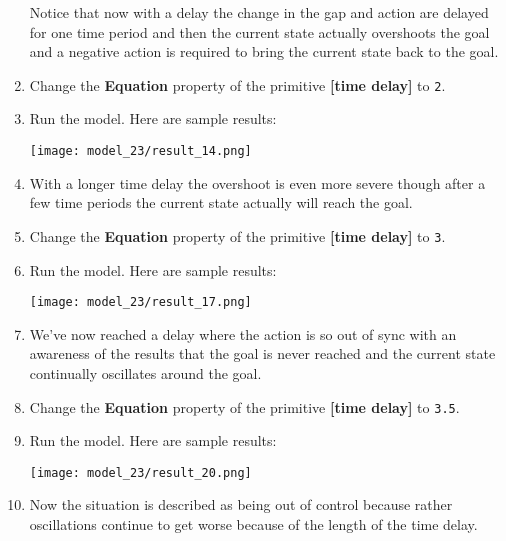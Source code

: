 \documentclass[]{memoir}
\makeatletter
\def\maxwidth{\ifdim\Gin@nat@width>\linewidth\linewidth
\else\Gin@nat@width\fi}
\let\Oldincludegraphics\includegraphics
\renewcommand{\includegraphics}[1]{\Oldincludegraphics[width=\maxwidth]{#1}}
\newcommand{\p}[1]{\textbf{{[}#1{]}}}
\newcommand{\e}[1]{\texttt{#1}}
\renewcommand{\a}[1]{\textbf{#1}}
\makeatother
\begin{document}
\begin{oframed}
\begin{enumerate}
Notice that now with a delay the change in the gap and action are delayed for one time period and then the current state actually overshoots the goal and a negative action is required to bring the current state back to the goal.


\item  Change the \a{Equation} property of the primitive \p{time delay} to \e{2}.
\item Run the model. Here are sample results:\par \begin{minipage}{\linewidth}  \centering \texttt{[image: model\_23/result\_14.png]}
\end{minipage}
\item 

With a longer time delay the overshoot is even more severe though after a few time periods the current state actually will reach the goal.


\item  Change the \a{Equation} property of the primitive \p{time delay} to \e{3}.
\item Run the model. Here are sample results:\par \begin{minipage}{\linewidth}  \centering \texttt{[image: model\_23/result\_17.png]}
\end{minipage}
\item 

We've now reached a delay where the action is so out of sync with an awareness of the results that the goal is never reached and the current state continually oscillates around the goal.


\item  Change the \a{Equation} property of the primitive \p{time delay} to \e{3.5}.
\item Run the model. Here are sample results:\par \begin{minipage}{\linewidth}  \centering \texttt{[image: model\_23/result\_20.png]}
\end{minipage}
\item 

Now the situation is described as being out of control because rather oscillations continue to get worse because of the length of the time delay.



\end{enumerate} \end{oframed}
\end{document}
